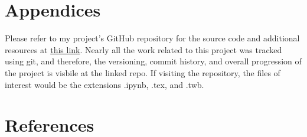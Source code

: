 \documentclass{article}
\theoremstyle{mytheoremstyle}
\theoremstyle{mytheoremstyle}
\theoremstyle{myproblemstyle}
\begin{document}
\pagebreak
\section{Appendices}
Please refer to my project's GitHub repository for the source code and additional resources at \href{https://github.com/Musiik-fn/620-Project-Codebase}{this link}. Nearly all the work related to this project was tracked using git, and therefore, the versioning, commit history, and overall progression of the project is visbile at the linked repo. If visiting the repository, the files of interest would be the extensions .ipynb, .tex, and .twb. 

\pagebreak
\section{References}
\end{document}
